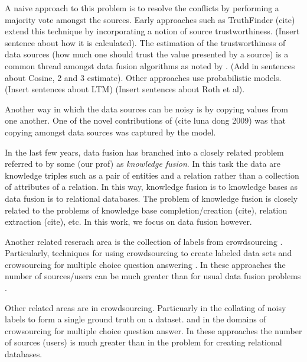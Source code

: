 \documentclass{acm_proc_article-sp}
\begin{document}
A naive approach to this problem is to resolve the conflicts by performing a majority vote amongst the sources. Early approaches such as {\sc TruthFinder} (cite)  extend this technique by incorporating a notion of source trustworthiness. (Insert sentence about how it is calculated). The estimation of the trustworthiness of data sources (how much one should trust the value presented by a source)  is a common thread amongst data fusion algorithms as noted by \cite{li:truth} \cite{waguih:truth}. (Add in sentences about Cosine, 2 and 3 estimate). Other approaches use probabilistic models. (Insert sentences about LTM) (Insert sentences about Roth et al).


Another way in which the data sources can be noisy is by copying values from one another. One of the novel contributions of (cite luna dong 2009) was that copying amongst data sources was captured by the model. 

In the last few years, data fusion has branched into a closely related problem referred to by some \cite{dong:data}(our prof) as \emph{knowledge fusion}. In this task the data are knowledge triples such as a pair of entities and a relation rather than a collection of attributes of a relation. In this way, knowledge fusion is to knowledge bases as data fusion is to relational databases. The problem of knowledge fusion is closely related to the problems of knowledge base completion/creation (cite), relation extraction (cite), etc. In this work, we focus on data fusion however.

Another related reserach area is the collection of labels from crowdsourcing \cite{nguyen:minimizing}. Particularly, techniques for using crowdsourcing to create labeled data sets and crowsourcing for multiple choice question answering \cite{bachrach:grade}. In these approaches the number of sources/users can be much greater than for usual data fusion problems \cite{li:truth} \cite{nguyen:minimizing}.



Other related areas are in crowdsourcing. Particuarly in the collating of noisy labels to form a single ground truth on a dataset. and in the domains of crowsourcing for multiple choice question answer. In these approaches the number of sources (users) is much greater than in the problem for creating relational databases.  


  

\balancecolumns
\end{document}
